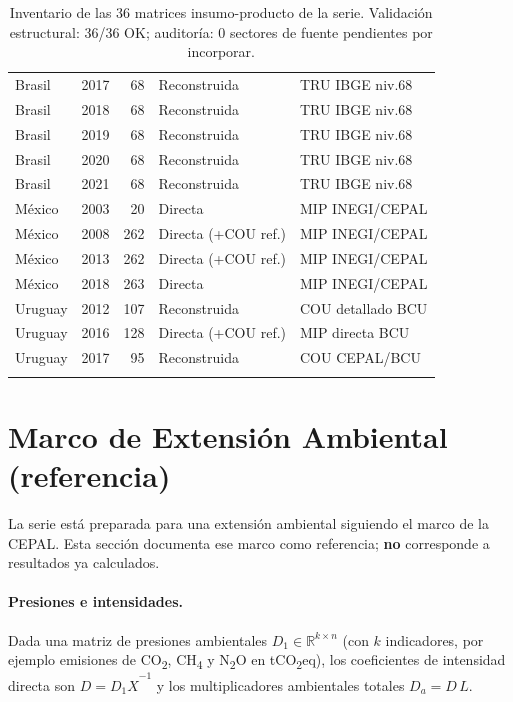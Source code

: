 \documentclass[11pt,a4paper]{article}
\newcommand{\R}{\mathbb{R}}
\begin{document}
\begin{center}
\begin{longtable}{llrll}
Brasil & 2017 & 68 & Reconstruida & TRU IBGE niv.68 \\
Brasil & 2018 & 68 & Reconstruida & TRU IBGE niv.68 \\
Brasil & 2019 & 68 & Reconstruida & TRU IBGE niv.68 \\
Brasil & 2020 & 68 & Reconstruida & TRU IBGE niv.68 \\
Brasil & 2021 & 68 & Reconstruida & TRU IBGE niv.68 \\
México & 2003 & 20 & Directa & MIP INEGI/CEPAL \\
México & 2008 & 262 & Directa (+COU ref.) & MIP INEGI/CEPAL \\
México & 2013 & 262 & Directa (+COU ref.) & MIP INEGI/CEPAL \\
México & 2018 & 263 & Directa & MIP INEGI/CEPAL \\
Uruguay & 2012 & 107 & Reconstruida & COU detallado BCU \\
Uruguay & 2016 & 128 & Directa (+COU ref.) & MIP directa BCU \\
Uruguay & 2017 & 95 & Reconstruida & COU CEPAL/BCU \\
\bottomrule
\caption{Inventario de las 36 matrices insumo-producto de la serie. Validación
estructural: 36/36 OK; auditoría: 0 sectores de fuente pendientes por
incorporar.}
\label{tab:inventario}
\end{longtable}
\end{center}

\section{Marco de Extensión Ambiental (referencia)}
\label{sec:ambiental}

La serie está preparada para una extensión ambiental siguiendo el marco de la
CEPAL. Esta sección documenta ese marco como referencia; \textbf{no} corresponde a
resultados ya calculados.

\paragraph{Presiones e intensidades.}
Dada una matriz de presiones ambientales $D_1\in\R^{k\times n}$ (con $k$
indicadores, por ejemplo emisiones de CO\textsubscript{2}, CH\textsubscript{4} y
N\textsubscript{2}O en tCO\textsubscript{2}eq), los coeficientes de intensidad
directa son $D = D_1\hat{X}^{-1}$ y los multiplicadores ambientales totales
$D_a = D\,L$.
\end{document}
